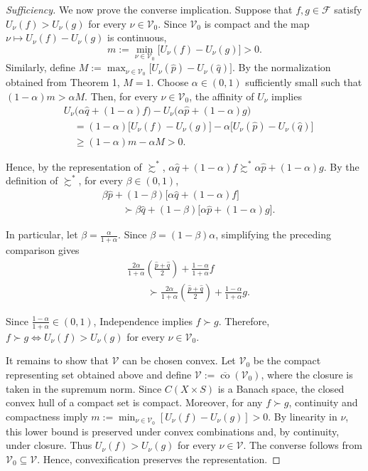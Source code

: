 \documentclass[11pt]{article}
\begin{document}
\begin{proof}[\textnormal{\textit{Sufficiency}}]
We now prove the converse implication. Suppose that
$f,g\in\mathcal{F}$ satisfy $U_\nu(f)>U_\nu(g)$ for every
$\nu\in\mathcal{V}_0$.
Since $\mathcal{V}_0$ is compact and the map
$\nu\mapsto U_\nu(f)-U_\nu(g)$ is continuous,
\[
    m:=\min_{\nu\in\mathcal{V}_0}
    \bigl[U_\nu(f)-U_\nu(g)\bigr]>0.
\]
Similarly, define $M:=\max_{\nu\in\mathcal{V}_0}
\bigl[U_\nu(\hat p)-U_\nu(\hat q)\bigr]$.
By the normalization obtained from Theorem 1, $M=1$.
Choose $\alpha\in(0,1)$ sufficiently small such that $(1-\alpha)m>\alpha M$.
Then, for every $\nu\in\mathcal{V}_0$, the affinity of $U_\nu$ implies
\[
\begin{aligned}
&U_\nu\bigl(\alpha\hat q+(1-\alpha)f\bigr)
-U_\nu\bigl(\alpha\hat p+(1-\alpha)g\bigr)\\
&\quad=(1-\alpha)
\bigl[U_\nu(f)-U_\nu(g)\bigr]
-\alpha
\bigl[U_\nu(\hat p)-U_\nu(\hat q)\bigr]\\
&\quad\geq(1-\alpha)m-\alpha M>0.
\end{aligned}
\]

Hence, by the representation of $\succsim^*$,
$\alpha\hat q+(1-\alpha)f\succsim^*\alpha\hat p+(1-\alpha)g$.
By the definition of $\succsim^*$, for every $\beta\in(0,1)$,
\[
\begin{aligned}
&\beta\hat p
+(1-\beta)\bigl[\alpha\hat q+(1-\alpha)f\bigr]\\
&\qquad\succ
\beta\hat q
+(1-\beta)\bigl[\alpha\hat p+(1-\alpha)g\bigr].
\end{aligned}
\]

In particular, let $\beta=\frac{\alpha}{1+\alpha}$.
Since $\beta=(1-\beta)\alpha$, simplifying the preceding comparison gives
\[
\begin{aligned}
&\frac{2\alpha}{1+\alpha}
\left(\frac{\hat p+\hat q}{2}\right)
+\frac{1-\alpha}{1+\alpha}f\\
&\qquad\succ
\frac{2\alpha}{1+\alpha}
\left(\frac{\hat p+\hat q}{2}\right)
+\frac{1-\alpha}{1+\alpha}g.
\end{aligned}
\]

Since $\frac{1-\alpha}{1+\alpha}\in(0,1)$, Independence implies $f\succ g$.
Therefore, $f\succ g\iff U_\nu(f)>U_\nu(g)$
for every $\nu\in\mathcal{V}_0$.

It remains to show that $\mathcal{V}$ can be chosen convex.
Let $\mathcal{V}_0$ be the compact representing set obtained
above and define $\mathcal{V}:=\overline{\operatorname{co}}(\mathcal{V}_0)$,
where the closure is taken in the supremum norm.
Since $C(X\times S)$ is a Banach space, the closed convex
hull of a compact set is compact. Moreover, for any
$f\succ g$, continuity and compactness imply
$m:=\min_{\nu\in\mathcal{V}_0}[U_\nu(f)-U_\nu(g)]>0$.
By linearity in $\nu$, this lower bound is preserved under
convex combinations and, by continuity, under closure.
Thus $U_\nu(f)>U_\nu(g)$ for every $\nu\in\mathcal{V}$.
The converse follows from $\mathcal{V}_0\subseteq\mathcal{V}$.
Hence, convexification preserves the representation.
\renewcommand{\qedsymbol}{$\blacksquare$}

\end{proof}
\end{document}
